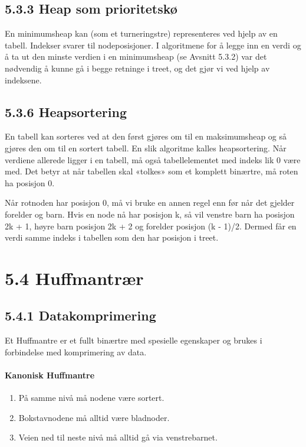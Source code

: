 \documentclass[11pt]{article}
\begin{document}
    \subsection{5.3.3 Heap som prioritetskø}
        En minimumsheap kan (som et turneringstre) representeres ved hjelp av en tabell. 
        Indekser svarer til nodeposisjoner. 
        I algoritmene for å legge inn en verdi og å ta ut den minste verdien i
        en minimumsheap (se Avsnitt 5.3.2) var det nødvendig å kunne gå i begge retninge i treet,
        og det gjør vi ved hjelp av indeksene. 


    \subsection{5.3.6 Heapsortering}
        En tabell kan sorteres ved at den først gjøres om til en maksimumsheap og så gjøres den om til
        en sortert tabell. En slik algoritme kalles heapsortering.
        Når verdiene allerede ligger i en tabell, må også tabellelementet med indeks lik 0 være med.
        Det betyr at når tabellen skal «tolkes» som et komplett binærtre, må roten ha posisjon 0.

        Når rotnoden har posisjon 0, må vi bruke en annen regel enn før når det gjelder forelder og
        barn. Hvis en node nå har posisjon k, så vil venstre barn ha posisjon 2k + 1, høyre barn
        posisjon 2k + 2 og forelder posisjon (k - 1)/2. Dermed får en verdi samme indeks i tabellen som den har posisjon i treet.
        

\section{5.4 Huffmantrær}
    \subsection{5.4.1 Datakomprimering}
        Et Huffmantre er et fullt binærtre med spesielle egenskaper og brukes i
        forbindelse med komprimering av data.

    \paragraph{Kanonisk Huffmantre}
    \begin{enumerate}
        \item På samme nivå må nodene være sortert.
        \item Bokstavnodene må alltid være bladnoder.
        \item Veien ned til neste nivå må alltid gå via venstrebarnet.
    \end{enumerate}
\end{document}
